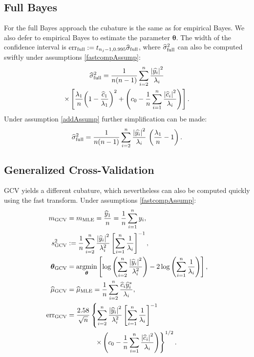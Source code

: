 \documentclass[twocolumn]{svjour3}          %
\newcommand{\bm}[1]{\boldsymbol{#1}}
\newcommand{\vtheta}{{\bm{\theta}}}
\newcommand{\hmu}{\widehat{\mu}}
\newcommand{\hsigma}{\widehat{\sigma}}
\newcommand{\MLE}{\text{MLE}}
\newcommand{\err}{\textup{err}}
\def\abs#1{\ensuremath{\left \lvert #1 \right \rvert}}
\providecommand{\argmin}{\operatorname*{argmin}}
\begin{document}
\subsection{Full Bayes}
For the full Bayes approach the cubature is the same as for empirical Bayes.  We also defer to empirical Bayes to estimate the parameter $\vtheta$.  The width of the confidence interval is $\err_{\textup{full}} 
:= t_{n_j-1,0.995} \hsigma_{\textup{full}}$, where $\hsigma_{\textup{full}}^2$ can also be computed swiftly under assumptions \eqref{fastcompAssump}:
\begin{multline*} %
\widehat{\sigma}^2_{\textup{full}}
=
\frac{1}{n(n-1)} \sum_{i=2}^n \frac{\abs{\widehat{y_i}}^2}{\lambda_i}
\\
\times
\left[\frac{\lambda_1}{n}{\left(1 - \frac{\widehat{c}_1}{\lambda_1}\right)^2} + \left(c_0  - \frac 1n \sum_{i=1}^n \frac{\abs{\widehat{c}_i}^2}{\lambda_i}\right) \right] .
\end{multline*}
Under assumption \eqref{addAssump} further simplification can be made:
\begin{equation*} %
\widehat{\sigma}^2_{\textup{full}}
=
\frac{1}{n(n-1)} \sum_{i=2}^n \frac{\abs{\widehat{y_i}}^2}{\lambda_i} \, \left(\frac{\lambda_1}{n}  - 1  \right).
\end{equation*}



\subsection{Generalized Cross-Validation}

GCV yields a different cubature, which nevertheless can also be computed quickly using the fast transform.  Under assumptions \eqref{fastcompAssump}:
\begin{align*}
m_{\textup{GCV}} & = m_\MLE =  \frac{\widehat{y}_1}{n} = \frac 1n \sum_{i=1}^n y_i,\\
 s^2_{\textup{GCV}} & : =  \frac 1{n} \sum_{i=2}^n \frac{\abs{\widehat{y}_i}^2}{\lambda_i^2}  \left [ \sum_{i=1}^n \frac{1}{\lambda_i} \right]^{-1}, \\
\vtheta_{\textup{GCV}} 
&= \argmin_\vtheta \left[ \log \left ( \sum_{i=2}^n \frac{\abs{\widehat{y}_i}^2}{\lambda_i^2} 
\right) -2\log\left( \sum_{i=1}^n \frac{1}{\lambda_i} \right)
\right], \\
\widehat{\mu}_{\textup{GCV}}
&= \hmu_\MLE  = 
\frac 1n \sum_{i=2}^n \frac{ \widehat{c}_i \widehat{y}_i^*}{\lambda_i}, \\
\err_{\textup{GCV}} & =
\frac{2.58}{\sqrt{n}}\left\{\sum_{i=2}^n \frac{\abs{\widehat{y}_i}^2}{\lambda_i^2}  \left [ \sum_{i=1}^n \frac{1}{\lambda_i} \right]^{-1} \right.
\\ 
&\qquad \qquad \left . \times
	\left( c_0 - \frac 1n \sum_{i=1}^n \frac{\abs{\widehat{c}_i}^2}{\lambda_i} \right) 
\right\}^{1/2}.
\end{align*}
\end{document}
